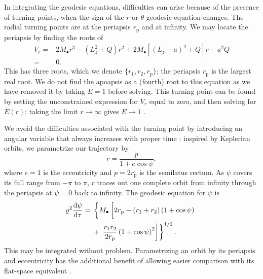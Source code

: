 \documentclass[useAMS,usedcolumn,usegraphicx,usenatbib]{mn2e}
\newcommand{\sub}[1]{\ensuremath{_\mathrm{#1}}}
\newcommand{\dd}{\ensuremath{\mathrm{d}}}
\newcommand{\diff}[2]{\ensuremath{\frac{\dd {#1}}{\dd {#2}}}}
\begin{document}
In integrating the geodesic equations, difficulties can arise because of the presence of turning points, when the sign of the $r$ or $\theta$ geodesic equation changes. The radial turning points are at the periapsis $r\sub{p}$ and at infinity. We may locate the periapsis by finding the roots of
\begin{align}
V_r = {} & 2M_\bullet r^3 - \left(L_z^2+Q\right)r^2 + 2M_\bullet\left[\left(L_z - a\right)^2 + Q\right]r - a^2 Q \nonumber \\
 = {} & 0.
\end{align}
This has three roots, which we denote $\{r_1, r_2, r\sub{p}\}$; the periapsis $r\sub{p}$ is the largest real root. We do not find the apoapsis as a (fourth) root to this equation as we have removed it by taking $E = 1$ before solving. This turning point can be found by setting the unconstrained expression for $V_r$ equal to zero, and then solving for $E(r)$; taking the limit $r \rightarrow \infty$ gives $E \rightarrow 1$ \citep{Wilkins1972}.

We avoid the difficulties associated with the turning point by introducing an angular variable that always increases with proper time \citep{Drasco2004}: inspired by Keplerian orbits, we parametrize our trajectory by
\begin{equation}
r = \frac{p}{1+e\cos\psi},
\end{equation}
where $e = 1$ is the eccentricity and $p = 2r\sub{p}$ is the semilatus rectum. As $\psi$ covers its full range from $-\pi$ to $\pi$, $r$ traces out one complete orbit from infinity through the periapsis at $\psi = 0$ back to infinity. The geodesic equation for $\psi$ is
\begin{align}
\varrho^2 \diff{\psi}{\tau} = {} & \left\{M_\bullet\left[2r\sub{p} - \left(r_1 + r_2\right)\left(1 + \cos\psi\right) \vphantom{\frac{r_1 r_2}{2r\sub{p}}} \right.\right. \nonumber \\*
 {} & + \left.\left. \frac{r_1 r_2}{2r\sub{p}}\left(1 + \cos\psi\right)^2\right]\right\}^{1/2}.
\end{align}
This may be integrated without problem. Parametrizing an orbit by its periapsis and eccentricity has the additional benefit of allowing easier comparison with its flat-space equivalent \citep*{Gair2005}.
\end{document}
